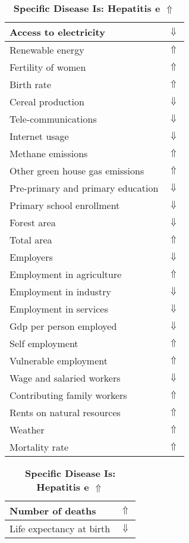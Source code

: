 \documentclass[12pt,notitlepage,oneside]{report}
\begin{document}
\begin{table}[!htb]
\caption{\textbf{Specific Disease Is: Hepatitis e $\Uparrow$}}
\centering
\label{Correlated Socio-economic Factors0}
\begin{tabular}{|l|l|}
\hline
Access to electricity & $\Downarrow$\\ \hline
Renewable energy & $\Uparrow$\\ \hline
Fertility of women & $\Uparrow$\\ \hline
Birth rate & $\Uparrow$\\ \hline
Cereal production & $\Downarrow$\\ \hline
Tele-communications & $\Downarrow$\\ \hline
Internet usage & $\Downarrow$\\ \hline
Methane emissions & $\Uparrow$\\ \hline
Other green house gas emissions & $\Uparrow$\\ \hline
Pre-primary and primary education & $\Downarrow$\\ \hline
Primary school enrollment & $\Downarrow$\\ \hline
Forest area & $\Downarrow$\\ \hline
Total area & $\Uparrow$\\ \hline
Employers & $\Downarrow$\\ \hline
Employment in agriculture & $\Uparrow$\\ \hline
Employment in industry & $\Downarrow$\\ \hline
Employment in services & $\Downarrow$\\ \hline
Gdp per person employed & $\Downarrow$\\ \hline
Self employment & $\Uparrow$\\ \hline
Vulnerable employment & $\Uparrow$\\ \hline
Wage and salaried workers & $\Downarrow$\\ \hline
Contributing family workers & $\Uparrow$\\ \hline
Rents on natural resources & $\Uparrow$\\ \hline
Weather & $\Uparrow$\\ \hline
Mortality rate & $\Uparrow$\\ \hline
\end{tabular}
\begin{tabular}{|l|l|}
\hline
Number of deaths & $\Uparrow$\\ \hline
Life expectancy at birth & $\Downarrow$\\ \hline

\end{tabular}
\end{table}
\end{document}
